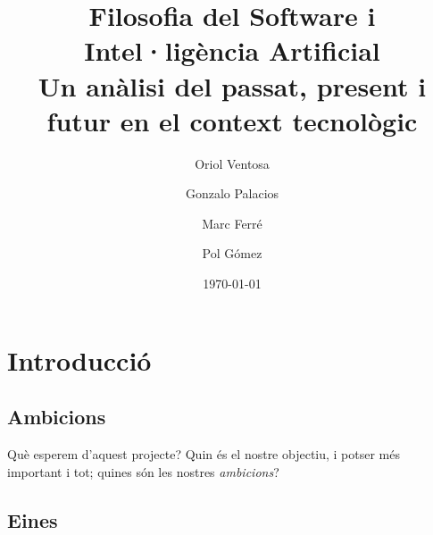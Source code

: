 \documentclass[a4paper,12pt]{report}
\begin{document}
\title{{\bf Filosofia del Software i Intel·ligència Artificial} \\ \vspace{2 mm} {\large Un anàlisi del
passat, present i futur en el context tecnològic}}
\author{Oriol Ventosa \and Gonzalo Palacios \and Marc Ferré \and Pol Gómez}
\date{\today}
\maketitle

\tableofcontents

\chapter{Introducció}
\section{Ambicions}
Què esperem d'aquest projecte? Quin és el nostre objectiu, i potser més
important i tot; quines són les nostres \emph{ambicions}?

\section{Eines}
\end{document}
